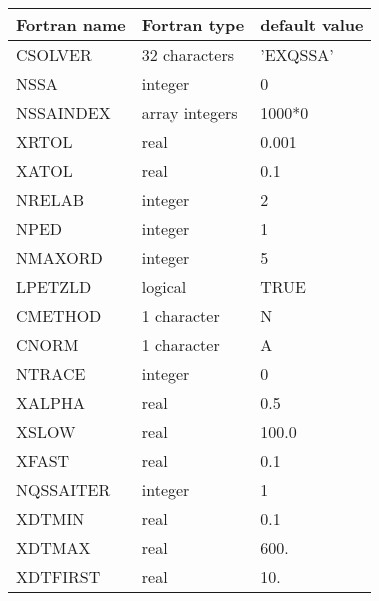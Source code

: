\begin{longtable} {|p{}|p{}|p{}|}
\hline
Fortran name &  Fortran type & default value \\
\hline 
\endhead
\hline
\endfoot
CSOLVER 	&32 characters 	&'EXQSSA'\\
NSSA 		&integer 	&0\\
NSSAINDEX 	&array integers &1000*0\\
XRTOL 		&real 		&0.001\\
XATOL 		&real 		&0.1\\
NRELAB 		&integer 	&2\\
NPED 		&integer 	&1\\
NMAXORD 	&integer 	&5\\
LPETZLD 	&logical 	&TRUE\\
CMETHOD 	&1 character 	&N\\
CNORM 		&1 character 	&A\\
NTRACE 		&integer 	&0\\
XALPHA 		&real 		&0.5\\
XSLOW 		&real 		&100.0\\
XFAST 		&real 		&0.1\\
NQSSAITER 	&integer 	&1\\
XDTMIN 		&real	 	&0.1\\
XDTMAX 		&real	 	&600.\\
XDTFIRST 	&real 		&10.\\
\end{longtable}

